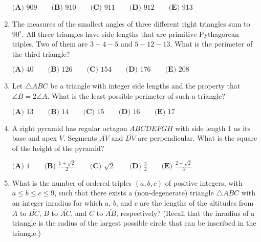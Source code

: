 \documentclass{article}
\begin{document}
\begin{enumerate}[label=\arabic*., itemsep=0.5em]
$
\textbf{(A) }909\qquad
\textbf{(B) }910\qquad
\textbf{(C) }911\qquad
\textbf{(D) }912\qquad
\textbf{(E) }913\qquad
$\par \vspace{0.5em}\item The measures of the smallest angles of three different right triangles sum to $90^\circ$. All three triangles have side lengths that are primitive Pythagorean triples. Two of them are $3-4-5$ and $5-12-13$. What is the perimeter of the third triangle?

$
\textbf{(A) }40 \qquad
\textbf{(B) }126 \qquad
\textbf{(C) }154 \qquad
\textbf{(D) }176 \qquad
\textbf{(E) }208 \qquad
$\par \vspace{0.5em}\item Let $\triangle{ABC}$ be a triangle with integer side lengths and the property that $\angle{B} = 2\angle{A}$. What is the least possible perimeter of such a triangle?

$
\textbf{(A) }13 \qquad
\textbf{(B) }14 \qquad
\textbf{(C) }15 \qquad
\textbf{(D) }16 \qquad
\textbf{(E) }17 \qquad
$\par \vspace{0.5em}\item A right pyramid has regular octagon $ABCDEFGH$ with side length $1$ as its base and apex $V.$ Segments $\overline{AV}$ and $\overline{DV}$ are perpendicular. What is the square of the height of the pyramid?

$
\textbf{(A) }1 \qquad
\textbf{(B) }\frac{1+\sqrt2}{2} \qquad
\textbf{(C) }\sqrt2 \qquad
\textbf{(D) }\frac32 \qquad
\textbf{(E) }\frac{2+\sqrt2}{3} \qquad
$\par \vspace{0.5em}\item What is the number of ordered triples $(a,b,c)$ of positive integers, with $a\le b\le c\le 9$, such that there exists a (non-degenerate) triangle $\triangle ABC$ with an integer inradius for which $a$, $b$, and $c$ are the lengths of the altitudes from $A$ to $\overline{BC}$, $B$ to $\overline{AC}$, and $C$ to $\overline{AB}$, respectively? (Recall that the inradius of a triangle is the radius of the largest possible circle that can be inscribed in the triangle.)


\end{enumerate}
\end{document}
